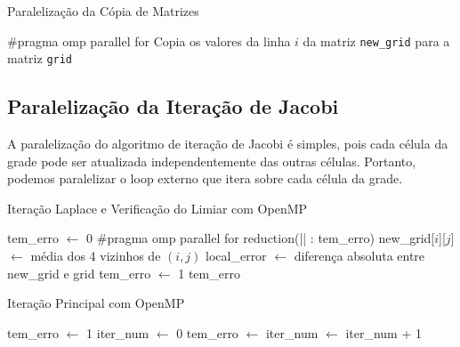 \documentclass[conference]{IEEEtran}
\begin{document}
\begin{algorithm}[H]
    \caption{Paralelização da Cópia de Matrizes}
    \begin{algorithmic}[1]
        \State \#pragma omp parallel for
        \State Copia os valores da linha $i$ da matriz \texttt{new\_grid} para a matriz \texttt{grid}
        \EndFor
        \EndFunction
    \end{algorithmic}
\end{algorithm}


\subsection{Paralelização da Iteração de Jacobi}

A paralelização do algoritmo de iteração de Jacobi é simples, pois cada célula da grade pode ser atualizada independentemente das outras células. Portanto, podemos paralelizar o loop externo que itera sobre cada célula da grade.

\begin{algorithm}[H]
    \caption{Iteração Laplace e Verificação do Limiar com OpenMP}
    \begin{algorithmic}[1]
        \State tem\_erro $\gets$ 0
        \State \#pragma omp parallel for reduction(|| : tem\_erro)
        \State new\_grid[$i$][$j$] $\gets$ média dos 4 vizinhos de $(i, j)$
        \State local\_error $\gets$ diferença absoluta entre new\_grid e grid
        \State tem\_erro $\gets$ 1
        \EndIf
        \EndFor
        \State \Return tem\_erro
        \EndFunction
    \end{algorithmic}
\end{algorithm}

\begin{algorithm}[H]
    \caption{Iteração Principal com OpenMP}
    \begin{algorithmic}[1]
        \State tem\_erro $\gets$ 1
        \State iter\_num $\gets$ 0
        \State tem\_erro $\gets$ 
        \State {}
        \State iter\_num $\gets$ iter\_num + 1
        \EndWhile
        \EndFunction
    \end{algorithmic}
\end{algorithm}
\end{document}

